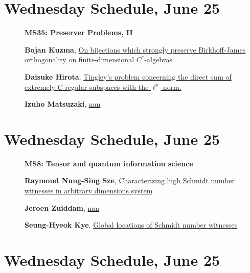 \documentclass[ILAS2025-program.tex]{subfiles}
\begin{document}
\section*{Wednesday Schedule, June 25 }
        
        \begin{description}
    \item[] {\color{mstitle}\textbf{MS35: Preserver Problems, II}} 
    \item[] \hypertarget{up0247}{}\textbf{Bojan Kuzma}, \hyperlink{down0247}{On bijections which strongly preserve Birkhoff-James orthogonality on finite-dimensional $C^*$-algebras}
        \item[] \hypertarget{up0248}{}\textbf{Daisuke Hirota}, \hyperlink{down0248}{Tingley's problem concerning the direct sum of extremely C-regular subspaces with the $\ell^p$-norm.}
        \item[] \hypertarget{up0249}{}\textbf{Izuho Matsuzaki}, \hyperlink{down0249}{nan}
        \end{description}
    \newpage

\section*{Wednesday Schedule, June 25 }
        
        \begin{description}
    \item[] {\color{mstitle}\textbf{MS8: Tensor and quantum information science}} 
    \item[] \hypertarget{up0250}{}\textbf{Raymond Nung-Sing Sze}, \hyperlink{down0250}{Characterizing high Schmidt number witnesses in arbitrary dimensions system
}
        \item[] \hypertarget{up0251}{}\textbf{Jeroen Zuiddam}, \hyperlink{down0251}{nan}
        \item[] \hypertarget{up0252}{}\textbf{Seung-Hyeok Kye}, \hyperlink{down0252}{Global locations of Schmidt number witnesses
}
        \end{description}
    \newpage

\section*{Wednesday Schedule, June 25 }
        
\end{document}
